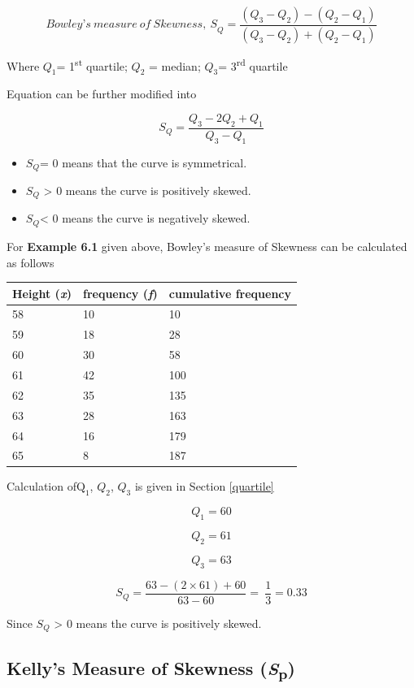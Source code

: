 \documentclass[
]{book}
\begin{document}
\[{Bowley’s\ measure\ of\ Skewness,\ S}_{Q} = \frac{\left( Q_{3} - Q_{2} \right) - \left( Q_{2} - Q_{1} \right)}{\left( Q_{3} - Q_{2} \right) + \left( Q_{2} - Q_{1} \right)}\]

Where \(Q_{1}\)= 1\textsuperscript{st} quartile; \(Q_{2}\) = median; \(Q_{3}\)= 3\textsuperscript{rd} quartile

Equation can be further modified into

\[S_{Q} = \frac{Q_{3} - 2Q_{2} + Q_{1}}{Q_{3} - Q_{1}}\]

\begin{itemize}
\item
  \(S_{Q}\)= 0 means that the curve is symmetrical.
\item
  \(S_{Q}\) \textgreater{} 0 means the curve is positively skewed.
\item
  \(S_{Q}\)\textless{} 0 means the curve is negatively skewed.
\end{itemize}

For \textbf{Example 6.1} given above, Bowley's measure of Skewness can be
calculated as follows

\begin{longtable}[]{@{}lll@{}}
\toprule
Height (\emph{x}) & frequency (\emph{f}) & cumulative frequency \\
\midrule
\endhead
58 & 10 & 10 \\
59 & 18 & 28 \\
60 & 30 & 58 \\
61 & 42 & 100 \\
62 & 35 & 135 \\
63 & 28 & 163 \\
64 & 16 & 179 \\
65 & 8 & 187 \\
\bottomrule
\end{longtable}

Calculation of\(\text{Q}_{1}\), \(Q_{2}\), \(Q_{3}\) is given in Section \ref{quartile}

\[{Q}_{1} = 60\]

\[Q_{2} = 61\]

\[Q_{3} = 63\]

\[S_{Q} = \frac{63 - (2 \times 61) + 60}{63 - 60} = \ \frac{1}{3} = 0.33\]

Since \(S_{Q}\) \textgreater{} 0 means the curve is positively skewed.

\hypertarget{kellys-measure-of-skewness-sp}{%
\subsection{\texorpdfstring{Kelly's Measure of Skewness (\emph{S}\textsubscript{p})}{Kelly's Measure of Skewness (Sp)}}\label{kellys-measure-of-skewness-sp}}
\end{document}
